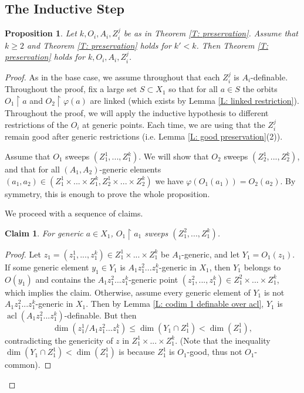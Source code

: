 \documentclass{amsart}
\newtheorem{claim}[theorem]{Claim}
\newtheorem{proposition}[theorem]{Proposition}
\theoremstyle{definition}
\begin{document}
    


\subsection{The Inductive Step}

\begin{proposition}\label{P: preservation inductive step}
    Let $k,O_i,A_i,Z_i^j$ be as in Theorem \ref{T: preservation}. Assume that $k\geq 2$ and Theorem \ref{T: preservation} holds for $k'<k$. Then Theorem \ref{T: preservation} holds for $k,O_i,A_i,Z_i^j$.
\end{proposition}
\begin{proof}
    As in the base case, we assume throughout that each $Z_i^j$ is $A_i$-definable. Throughout the proof, fix a large set $S\subset X_1$ so that for all $a\in S$ the orbits $O_1\restriction a$ and $O_2\restriction\varphi(a)$ are linked (which exists by Lemma \ref{L: linked restriction}). Throughout the proof, we will apply the inductive hypothesis to different restrictions of the $O_i$ at generic points. Each time, we are using that the $Z_i^j$ remain good after generic restrictions (i.e. Lemma \ref{L: good preservation}(2)).
    
    Assume that $O_1$ sweeps $(Z_1^1,...,Z_1^k)$. We will show that $O_2$ sweeps $(Z_2^1,...,Z_2^k)$, and that for all $(A_1,A_2)$-generic elements $(a_1,a_2)\in(Z_1^1\times...\times Z_1^k,Z_2^1\times...\times Z_2^k)$ we have $\varphi(O_1(a_1))=O_2(a_2)$. By symmetry, this is enough to prove the whole proposition.

    We proceed with a sequence of claims.

    \begin{claim}\label{Cl: preservation inductive step claim 1} For generic $a\in X_1$, $O_1\restriction a_1$ sweeps $(Z_1^2,...,Z_1^k)$.
    \end{claim}
    \begin{proof}
        Let $z_1=(z_1^1,...,z_1^k)\in Z_1^1\times...\times Z_1^k$ be $A_1$-generic, and let $Y_1=O_1(z_1)$. If some generic element $y_1\in Y_1$ is $A_1z_1^2...z_1^k$-generic in $X_1$, then $Y_1$ belongs to $O(y_1)$ and contains the $A_1z_1^2...z_1^k$-generic point $(z_1^2,...,z_1^k)\in Z_1^2\times...\times Z_1^k$, which implies the claim. Otherwise, assume every generic element of $Y_1$ is not $A_1z_1^2...z_1^k$-generic in $X_1$. Then by Lemma \ref{L: codim 1 definable over acl}, $Y_1$ is $\operatorname{acl}(A_1z_1^2...z_1^k)$-definable. But then $$\dim(z_1^1/A_1z_1^2...z_1^k)\leq\dim(Y_1\cap Z_1^1)<\dim(Z_1^1),$$ contradicting the genericity of $z$ in $Z_1^1\times...\times Z_1^k$. (Note that the inequality $\dim(Y_1\cap Z_1^1)<\dim(Z_1^1)$ is because $Z_1^1$ is $O_1$-good, thus not $O_1$-common). 
    \end{proof}


\end{proof}
\end{document}
